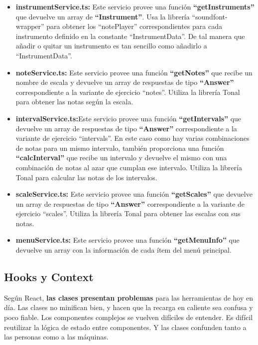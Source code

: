 \documentclass[12pt,twoside,titlepage]{report}
\begin{document}
\begin{itemize}
    \item \textbf{instrumentService.ts:} Este servicio provee una función \textbf{``getInstruments''} que devuelve un array de \textbf{``Instrument''}. Usa la librería ``soundfont-wrapper'' para obtener los ``notePlayer'' correspondientes para cada instrumento definido en la constante ``InstrumentData''. De tal manera que añadir o quitar un instrumento es tan sencillo como añadirlo a ``InstrumentData''.
    \item \textbf{noteService.ts:} Este servicio provee una función \textbf{``getNotes''} que recibe un nombre de escala y devuelve un array de respuestas de tipo \textbf{``Answer''} correspondiente a la variante de ejercicio ``notes''. Utiliza la librería Tonal para obtener las notas según la escala.
    \item \textbf{intervalService.ts:}Este servicio provee una función \textbf{``getIntervals''} que devuelve un array de respuestas de tipo \textbf{``Answer''} correspondiente a la  variante de ejercicio ``intervals''. En este caso como hay varias combinaciones de notas para un mismo intervalo, también proporciona una función \textbf{``calcInterval''} que recibe un intervalo y devuelve el mismo con una combinación de notas al azar que cumplan ese intervalo. Utiliza la librería Tonal para calcular las notas de los intervalos.
    \item \textbf{scaleService.ts:} Este servicio provee una función \textbf{``getScales''} que devuelve un array de respuestas de tipo \textbf{``Answer''} correspondiente a la  variante de ejercicio ``scales''. Utiliza la librería Tonal para obtener las escalas con sus notas.
    \item \textbf{menuService.ts:} Este servicio provee una función \textbf{``getMenuInfo''} que devuelve un array con la información de cada ítem del menú principal. 
\end{itemize}

\subsection{Hooks y Context}

Según React, \textbf{las clases presentan problemas} para las herramientas de hoy en día. Las clases no minifican bien, y hacen que la recarga en caliente sea confusa y poco fiable. Los componentes complejos se vuelven difíciles de entender. Es difícil reutilizar la lógica de estado entre componentes. Y las clases confunden tanto a las personas como a las máquinas. \cite{reactHooks}
\end{document}
